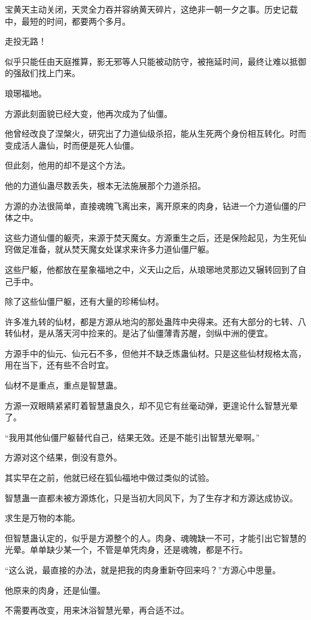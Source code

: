 \begin{this_body}
宝黄天主动关闭，天灵全力吞并容纳黄天碎片，这绝非一朝一夕之事。历史记载中，最短的时间，都要两个多月。

走投无路！

似乎只能任由天庭推算，影无邪等人只能被动防守，被拖延时间，最终让难以抵御的强敌们找上门来。

琅琊福地。

方源此刻面貌已经大变，他再次成为了仙僵。

他曾经改良了涅槃火，研究出了力道仙级杀招，能从生死两个身份相互转化。时而变成活人蛊仙，时而便是死人仙僵。

但此刻，他用的却不是这个方法。

他的力道仙蛊尽数丢失，根本无法施展那个力道杀招。

方源的办法很简单，直接魂魄飞离出来，离开原来的肉身，钻进一个力道仙僵的尸体之中。

这些力道仙僵的躯壳，来源于焚天魔女。方源重生之后，还是保险起见，为生死仙窍做足准备，就从焚天魔女处谋求来许多力道仙僵尸躯。

这些尸躯，他都放在星象福地之中，义天山之后，从琅琊地灵那边又辗转回到了自己手中。

除了这些仙僵尸躯，还有大量的珍稀仙材。

许多准九转的仙材，都是方源从地沟的那处蛊阵中央得来。还有大部分的七转、八转仙材，是从落天河中捡来的。是沾了仙僵薄青苏醒，剑纵中洲的便宜。

方源手中的仙元、仙元石不多，但他并不缺乏炼蛊仙材。只是这些仙材规格太高，用在当下，还有些不合时宜。

仙材不是重点，重点是智慧蛊。

方源一双眼睛紧紧盯着智慧蛊良久，却不见它有丝毫动弹，更遑论什么智慧光晕了。

“我用其他仙僵尸躯替代自己，结果无效。还是不能引出智慧光晕啊。”

方源对这个结果，倒没有意外。

其实早在之前，他就已经在狐仙福地中做过类似的试验。

智慧蛊一直都未被方源炼化，只是当初大同风下，为了生存才和方源达成协议。

求生是万物的本能。

但智慧蛊认定的，似乎是方源整个的人。肉身、魂魄缺一不可，才能引出它智慧的光晕。单单缺少某一个，不管是单凭肉身，还是魂魄，都是不行。

“这么说，最直接的办法，就是把我的肉身重新夺回来吗？”方源心中思量。

他原来的肉身，还是仙僵。

不需要再改变，用来沐浴智慧光晕，再合适不过。


\end{this_body}
